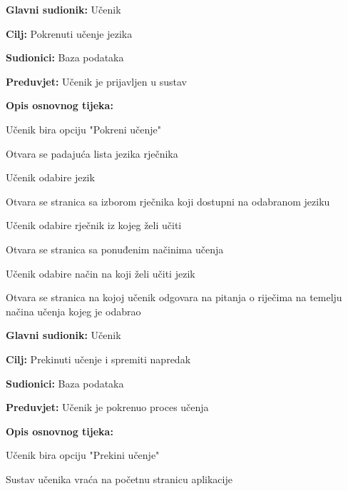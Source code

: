 					\noindent {}
					\begin{packed_item}
	
						\item \textbf{Glavni sudionik: }Učenik
						\item  \textbf{Cilj:} Pokrenuti učenje jezika
						\item  \textbf{Sudionici:} Baza podataka
						\item  \textbf{Preduvjet:} Učenik je prijavljen u sustav
						\item  \textbf{Opis osnovnog tijeka:}
						
						\item[] \begin{packed_enum}
	
							\item Učenik bira opciju "Pokreni učenje"
							\item Otvara se padajuća lista jezika rječnika
							\item Učenik odabire jezik
							\item Otvara se stranica sa izborom rječnika koji dostupni na odabranom jeziku
							\item Učenik odabire rječnik iz kojeg želi učiti
							\item Otvara se stranica sa ponuđenim načinima učenja
							\item Učenik odabire način na koji želi učiti jezik
							\item Otvara se stranica na kojoj učenik odgovara na pitanja o riječima na temelju načina učenja kojeg je odabrao
						\end{packed_enum}
						
					\end{packed_item}

					\noindent \underbar{\textbf{UC8 - Prekid učenja}}
					\begin{packed_item}
	
						\item \textbf{Glavni sudionik: }Učenik
						\item  \textbf{Cilj:} Prekinuti učenje i spremiti napredak
						\item  \textbf{Sudionici:} Baza podataka
						\item  \textbf{Preduvjet:} Učenik je pokrenuo proces učenja
						\item  \textbf{Opis osnovnog tijeka:}
						
						\item[] \begin{packed_enum}
	
							\item Učenik bira opciju "Prekini učenje"
							\item Sustav učenika vraća na početnu stranicu aplikacije
						\end{packed_enum}
						
					\end{packed_item}

